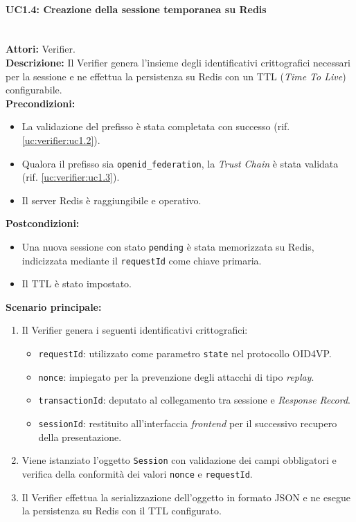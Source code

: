 \paragraph{\large\bfseries UC1.4: Creazione della sessione temporanea su Redis}
\label{uc:verifier:uc1.4}
\mbox{}\\
\noindent\textbf{Attori:} Verifier.
\\
\noindent\textbf{Descrizione:} Il Verifier genera l'insieme degli identificativi crittografici necessari per la sessione e ne effettua la persistenza su Redis con un TTL (\textit{Time To Live}) configurabile.
\\
\noindent\textbf{Precondizioni:}
\begin{itemize}
    \item La validazione del prefisso è stata completata con successo (rif. \ref{uc:verifier:uc1.2}).
    \item Qualora il prefisso sia \texttt{openid\_\allowbreak{}federation}, la \textit{Trust Chain} è stata validata (rif. \ref{uc:verifier:uc1.3}).
    \item Il server Redis è raggiungibile e operativo.
\end{itemize}
\noindent\textbf{Postcondizioni:}
\begin{itemize}
    \item Una nuova sessione con stato \texttt{pending} è stata memorizzata su Redis, indicizzata mediante il \texttt{requestId} come chiave primaria.
    \item Il TTL è stato impostato.
\end{itemize}
\noindent\textbf{Scenario principale:}
\begin{enumerate}
    \item Il Verifier genera i seguenti identificativi crittografici:
    \begin{itemize}
        \item \texttt{requestId}: utilizzato come parametro \texttt{state} nel protocollo OID4VP.
        \item \texttt{nonce}: impiegato per la prevenzione degli attacchi di tipo \textit{replay}.
        \item \texttt{transactionId}: deputato al collegamento tra sessione e \textit{Response Record}.
        \item \texttt{sessionId}: restituito all'interfaccia \textit{frontend} per il successivo recupero della presentazione.
    \end{itemize}
    \item Viene istanziato l'oggetto \texttt{Session} con validazione dei campi obbligatori e verifica della conformità dei valori \texttt{nonce} e \texttt{requestId}.
    \item Il Verifier effettua la serializzazione dell'oggetto in formato JSON e ne esegue la persistenza su Redis con il TTL configurato.
\end{enumerate}
